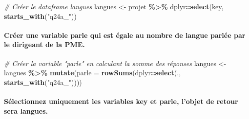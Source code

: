 \documentclass[
]{article}
\newenvironment{Shaded}{\begin{snugshade}}{\end{snugshade}}
\newcommand{\AttributeTok}[1]{\textcolor[rgb]{0.13,0.29,0.53}{#1}}
\newcommand{\CommentTok}[1]{\textcolor[rgb]{0.56,0.35,0.01}{\textit{#1}}}
\newcommand{\FunctionTok}[1]{\textcolor[rgb]{0.13,0.29,0.53}{\textbf{#1}}}
\newcommand{\NormalTok}[1]{#1}
\newcommand{\OtherTok}[1]{\textcolor[rgb]{0.56,0.35,0.01}{#1}}
\newcommand{\SpecialCharTok}[1]{\textcolor[rgb]{0.81,0.36,0.00}{\textbf{#1}}}
\newcommand{\StringTok}[1]{\textcolor[rgb]{0.31,0.60,0.02}{#1}}
\begin{document}
\hfill\break

\begin{Shaded}
\begin{Highlighting}[]
\CommentTok{\# Créer le dataframe langues }
\NormalTok{langues }\OtherTok{\textless{}{-}}\NormalTok{ projet }\SpecialCharTok{\%\textgreater{}\%}              
\NormalTok{               dplyr}\SpecialCharTok{::}\FunctionTok{select}\NormalTok{(key, }\FunctionTok{starts\_with}\NormalTok{(}\StringTok{"q24a\_"}\NormalTok{))}
\end{Highlighting}
\end{Shaded}

\hfill\break

\hypertarget{cruxe9er-une-variable-parle-qui-est-uxe9gale-au-nombre-de-langue-parluxe9e-par-le-dirigeant-de-la-pme.}{%
\paragraph{Créer une variable parle qui est égale au nombre de langue
parlée par le dirigeant de la
PME.}\label{cruxe9er-une-variable-parle-qui-est-uxe9gale-au-nombre-de-langue-parluxe9e-par-le-dirigeant-de-la-pme.}}

\hfill\break

\begin{Shaded}
\begin{Highlighting}[]
\CommentTok{\# Créer la variable "parle" en calculant la somme des réponses }
\NormalTok{langues }\OtherTok{\textless{}{-}}\NormalTok{ langues }\SpecialCharTok{\%\textgreater{}\%}                 
               \FunctionTok{mutate}\NormalTok{(}\AttributeTok{parle =} \FunctionTok{rowSums}\NormalTok{(dplyr}\SpecialCharTok{::}\FunctionTok{select}\NormalTok{(., }\FunctionTok{starts\_with}\NormalTok{(}\StringTok{"q24a\_"}\NormalTok{))))  }
\end{Highlighting}
\end{Shaded}

\hfill\break

\hypertarget{suxe9lectionnez-uniquement-les-variables-key-et-parle-lobjet-de-retour-sera-langues.}{%
\paragraph{Sélectionnez uniquement les variables key et parle, l'objet
de retour sera
langues.}\label{suxe9lectionnez-uniquement-les-variables-key-et-parle-lobjet-de-retour-sera-langues.}}

\hfill\break
\end{document}
